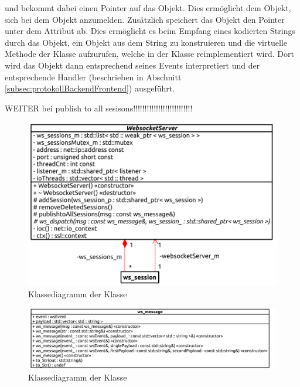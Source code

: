 und bekommt dabei einen Pointer auf das  Objekt. Dies ermöglicht dem  Objekt, 
sich bei dem  Objekt anzumelden. 
Zusätzlich speichert das  Objekt den Pointer unter dem Attribut  ab.
Dies ermöglicht es beim Empfang eines kodierten Strings durch das  Objekt, ein  Objekt aus dem String zu konstruieren
und die virtuelle Methode  der  Klasse aufzurufen, welche in der  Klasse reimplementiert wird.
Dort wird das  Objekt dann entsprechend seines Events interpretiert und der entsprechende Handler (beschrieben in Abschnitt \ref{subsec:protokollBackendFrontend}) ausgeführt.

WEITER bei publish to all sesisons!!!!!!!!!!!!!!!!!!!!!!!!!!

\begin{figure}[ht]
  \centering
  \includegraphics[width=\textwidth]{content/hauptteil/umsetzungPoC/backend/uml/classesOfOverview/WebsocketServer.pdf}
  \caption{Klassediagramm der Klasse }
  \label{fig:backend:classDiag:WebsocketServer}
\end{figure}
\begin{figure}[ht]
  \centering
  \includegraphics[width=\textwidth]{content/hauptteil/umsetzungPoC/backend/uml/classesOfOverview/ws_message.pdf}
  \caption{Klassediagramm der Klasse }
  \label{fig:backend:classDiag:wsMsg}
\end{figure}



